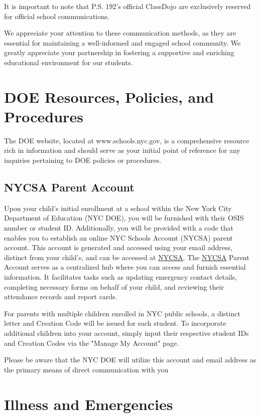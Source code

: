 \documentclass[11pt]{article}
\begin{document}
It is important to note that P.S. 192’s official ClassDojo are exclusively reserved for official school communications.

We appreciate your attention to these communication methods, as they are essential for maintaining a well-informed and engaged school community. We greatly appreciate your partnership in fostering a supportive and enriching educational environment for our students.

\section{DOE Resources, Policies, and Procedures}
\label{sec:orgd9b9edc}
The DOE website, located at www.schools.nyc.gov, is a comprehensive resource rich in information and should serve as your initial point of reference for any inquiries pertaining to DOE policies or procedures.

\subsection{NYCSA Parent Account}
\label{sec:org639d1e9}
Upon your child’s initial enrollment at a school within the New York City Department of Education (NYC DOE), you will be furnished with their OSIS number or student ID. Additionally, you will be provided with a code that enables you to establish an online NYC Schools Account (NYCSA) parent account. This account is generated and accessed using your email address, distinct from your child’s, and can be accessed at \href{https://www.schoolsaccount.nyc/}{NYCSA}. The  \href{https://www.schoolsaccount.nyc/}{NYCSA} Parent Account serves as a centralized hub where you can access and furnish essential information. It facilitates tasks such as updating emergency contact details, completing necessary forms on behalf of your child, and reviewing their attendance records and report cards.

For parents with multiple children enrolled in NYC public schools, a distinct letter and Creation Code will be issued for each student. To incorporate additional children into your account, simply input their respective student IDs and Creation Codes via the "Manage My Account" page.

Please be aware that the NYC DOE will utilize this account and email address as the primary means of direct communication with you

\section{Illness and Emergencies}
\label{sec:org1be495e}
\end{document}

